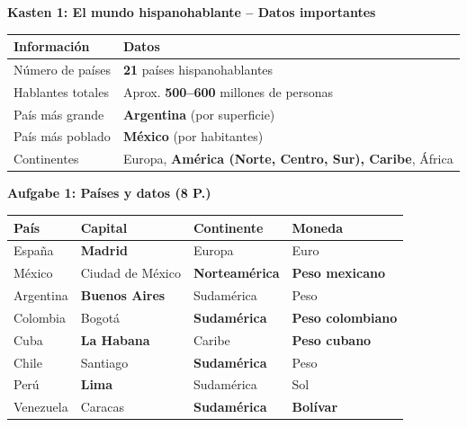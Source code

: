 \documentclass[11pt,a4paper]{article}
\newcommand{\lsg}[1]{\textcolor{loesung}{\textbf{#1}}}
\begin{document}
\vspace{1em}

\begin{gruppeBbox}

\textbf{Kasten 1: El mundo hispanohablante -- Datos importantes}

\begin{tabularx}{\textwidth}{@{}|p{3cm}|X|@{}}
\hline
\textbf{Información} & \textbf{Datos} \\
\hline
Número de países & \lsg{21} países hispanohablantes \\
\hline
Hablantes totales & Aprox. \lsg{500--600} millones de personas \\
\hline
País más grande & \lsg{Argentina} (por superficie) \\
\hline
País más poblado & \lsg{México} (por habitantes) \\
\hline
Continentes & Europa, \lsg{América (Norte, Centro, Sur), Caribe}, África \\
\hline
\end{tabularx}

\vspace{0.8em}

\textbf{Aufgabe 1: Países y datos (8 P.)}

\begin{tabularx}{\textwidth}{@{}|p{2.5cm}|X|X|p{2.5cm}|@{}}
\hline
\textbf{País} & \textbf{Capital} & \textbf{Continente} & \textbf{Moneda} \\
\hline
España & \lsg{Madrid} & Europa & Euro \\
\hline
México & Ciudad de México & \lsg{Norteamérica} & \lsg{Peso mexicano} \\
\hline
Argentina & \lsg{Buenos Aires} & Sudamérica & Peso \\
\hline
Colombia & Bogotá & \lsg{Sudamérica} & \lsg{Peso colombiano} \\
\hline
Cuba & \lsg{La Habana} & Caribe & \lsg{Peso cubano} \\
\hline
Chile & Santiago & \lsg{Sudamérica} & Peso \\
\hline
Perú & \lsg{Lima} & Sudamérica & Sol \\
\hline
Venezuela & Caracas & \lsg{Sudamérica} & \lsg{Bolívar} \\
\hline
\end{tabularx}


\end{gruppeBbox}
\end{document}
